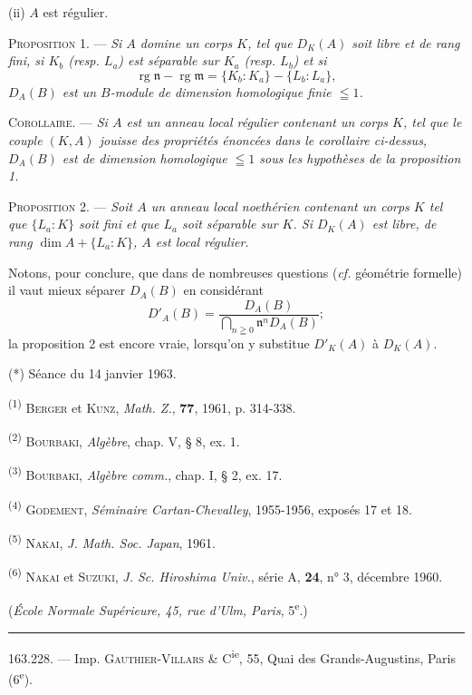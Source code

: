 (ii) $A$ est régulier.

\textsc{Proposition 1.} --- \textit{Si $A$ domine un corps $K$, tel que $D_K(A)$ soit libre et de rang fini, si $K_b$ (resp. $L_a$) est séparable sur $K_a$ (resp. $L_b$) et si}
\[
\operatorname{rg}\mathfrak n-\operatorname{rg}\mathfrak m=\{K_b:K_a\}-\{L_b:L_a\},
\]
\textit{$D_A(B)$ est un $B$-module de dimension homologique finie $\leqq1$.}

\textsc{Corollaire.} --- \textit{Si $A$ est un anneau local régulier contenant un corps $K$, tel que le couple $(K,A)$ jouisse des propriétés énoncées dans le corollaire ci-dessus, $D_A(B)$ est de dimension homologique $\leqq1$ sous les hypothèses de la proposition 1.}

\textsc{Proposition 2.} --- \textit{Soit $A$ un anneau local noethérien contenant un corps $K$ tel que $\{L_a:K\}$ soit fini et que $L_a$ soit séparable sur $K$. Si $D_K(A)$ est libre, de rang $\dim A+\{L_a:K\}$, $A$ est local régulier.}

Notons, pour conclure, que dans de nombreuses questions (\textit{cf.} géométrie formelle) il vaut mieux séparer $D_A(B)$ en considérant
\[
D'_A(B)=\frac{D_A(B)}{\displaystyle\bigcap_{n\geqq0}\mathfrak n^n D_A(B)};
\]
la proposition 2 est encore vraie, lorsqu'on y substitue $D'_K(A)$ à $D_K(A)$.

(*) Séance du 14 janvier 1963.

\textsuperscript{(1)} \textsc{Berger} et \textsc{Kunz}, \textit{Math. Z.}, \textbf{77}, 1961, p. 314-338.

\textsuperscript{(2)} \textsc{Bourbaki}, \textit{Algèbre}, chap. V, § 8, ex. 1.

\textsuperscript{(3)} \textsc{Bourbaki}, \textit{Algèbre comm.}, chap. I, § 2, ex. 17.

\textsuperscript{(4)} \textsc{Godement}, \textit{Séminaire Cartan-Chevalley}, 1955-1956, exposés 17 et 18.

\textsuperscript{(5)} \textsc{Nakai}, \textit{J. Math. Soc. Japan}, 1961.

\textsuperscript{(6)} \textsc{Nakai} et \textsc{Suzuki}, \textit{J. Sc. Hiroshima Univ.}, série A, \textbf{24}, n° 3, décembre 1960.

\hfill (\textit{École Normale Supérieure, 45, rue d'Ulm, Paris}, 5\textsuperscript{e}.)


\hrule
163.228. --- Imp. \textsc{Gauthier-Villars} \& C\textsuperscript{ie}, 55, Quai des Grands-Augustins, Paris (6\textsuperscript{e}).

